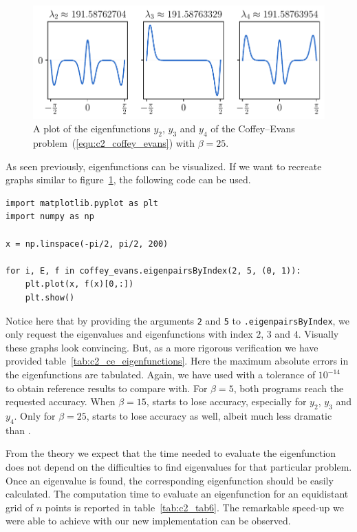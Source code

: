 \begin{figure}
    \begin{center}
        \includegraphics[width=1\textwidth]{img/chapter2/pyslise_test/coffey_evans_eigenfunctions.pdf}
    \end{center}
    \caption{A plot of the eigenfunctions $y_2$, $y_3$ and $y_4$ of the Coffey--Evans problem~(\ref{equ:c2_coffey_evans}) with $\beta=25$.}\label{fig:coffey_evans_eigenfunctions}
\end{figure}

As seen previously, eigenfunctions can be visualized. If we want to recreate graphs similar to figure~\ref{fig:coffey_evans_eigenfunctions}, the following code can be used.
\begin{verbatim}
import matplotlib.pyplot as plt
import numpy as np

x = np.linspace(-pi/2, pi/2, 200)

for i, E, f in coffey_evans.eigenpairsByIndex(2, 5, (0, 1)):
    plt.plot(x, f(x)[0,:])
    plt.show()
\end{verbatim}
Notice here that by providing the arguments \texttt{2} and \texttt{5} to \texttt{.eigenpairsByIndex}, we only request the eigenvalues and eigenfunctions with index $2$, $3$ and $4$. Visually these graphs look convincing. But, as a more rigorous verification we have provided table~\ref{tab:c2_ce_eigenfunctions}. Here the maximum absolute errors in the eigenfunctions are tabulated. Again, we have used  with a tolerance of $10^{-14}$ to obtain reference results to compare with. For $\beta = 5$, both programs reach the requested accuracy. When $\beta=15$,  starts to lose accuracy, especially for $y_2$, $y_3$ and $y_4$. Only for $\beta = 25$, starts \pyslise to lose accuracy as well, albeit much less dramatic than .

From the theory we expect that the time needed to evaluate the eigenfunction does not depend on the difficulties to find eigenvalues for that particular problem. Once an eigenvalue is found, the corresponding eigenfunction should be easily calculated. The computation time to evaluate an eigenfunction for an equidistant grid of $n$ points is reported in table~\ref{tab:c2_tab6}. The remarkable speed-up we were able to achieve with our new implementation can be observed.

